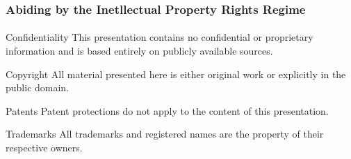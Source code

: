 \begin{verblatex}

\begin{frame}[fragile,plain,label=abidingIpr]
    \frametitle{Abiding by the Inetllectual Property Rights Regime}
    \framesubtitle{}


    \begin{block}{Confidentiality}
      This presentation contains no confidential or proprietary information and is based entirely on publicly available sources.
    \end{block}

    \begin{alertblock}{Copyright}
      All material presented here is either original work or explicitly in the public domain.
    \end{alertblock}

    \begin{exampleblock}{Patents}
      Patent protections do not apply to the content of this presentation.
    \end{exampleblock}

    \begin{block}{Trademarks}
      All trademarks and registered names are the property of their respective owners.
    \end{block}


\end{frame}
\end{verblatex}

